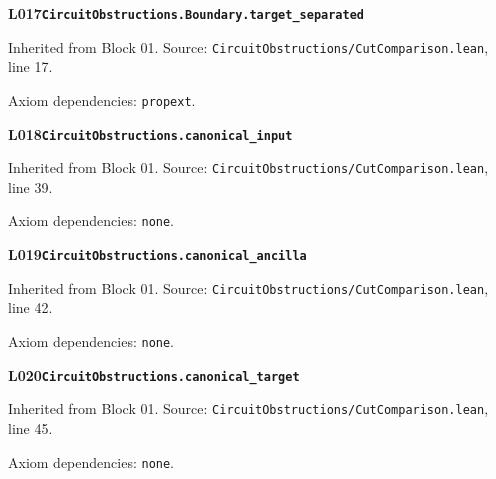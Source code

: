 \begin{minipage}{\linewidth}
\hypertarget{L017}{}
{\small\sffamily\bfseries\color{ink}L017\quad\nolinkurl{CircuitObstructions.Boundary.target_separated}}\par
{\scriptsize\sffamily\color{muted}Inherited from Block 01. Source: \nolinkurl{CircuitObstructions/CutComparison.lean}, line 17.}\par
{}
{\scriptsize\sffamily\color{muted}Axiom dependencies: \nolinkurl{propext}.}
\end{minipage}\par\medskip
\begin{minipage}{\linewidth}
\hypertarget{L018}{}
{\small\sffamily\bfseries\color{ink}L018\quad\nolinkurl{CircuitObstructions.canonical_input}}\par
{\scriptsize\sffamily\color{muted}Inherited from Block 01. Source: \nolinkurl{CircuitObstructions/CutComparison.lean}, line 39.}\par
{}
{\scriptsize\sffamily\color{muted}Axiom dependencies: \nolinkurl{none}.}
\end{minipage}\par\medskip
\begin{minipage}{\linewidth}
\hypertarget{L019}{}
{\small\sffamily\bfseries\color{ink}L019\quad\nolinkurl{CircuitObstructions.canonical_ancilla}}\par
{\scriptsize\sffamily\color{muted}Inherited from Block 01. Source: \nolinkurl{CircuitObstructions/CutComparison.lean}, line 42.}\par
{}
{\scriptsize\sffamily\color{muted}Axiom dependencies: \nolinkurl{none}.}
\end{minipage}\par\medskip
\begin{minipage}{\linewidth}
\hypertarget{L020}{}
{\small\sffamily\bfseries\color{ink}L020\quad\nolinkurl{CircuitObstructions.canonical_target}}\par
{\scriptsize\sffamily\color{muted}Inherited from Block 01. Source: \nolinkurl{CircuitObstructions/CutComparison.lean}, line 45.}\par
{}
{\scriptsize\sffamily\color{muted}Axiom dependencies: \nolinkurl{none}.}
\end{minipage}\par\medskip
